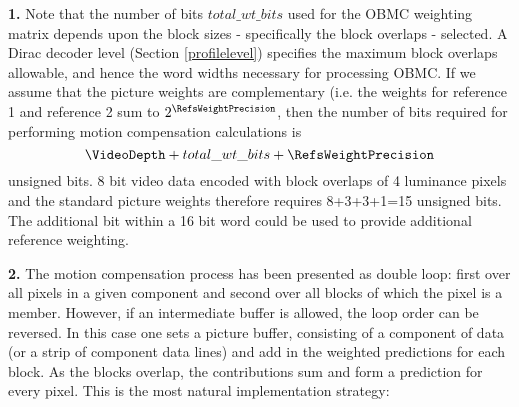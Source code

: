 \begin{informative}

{\bf 1.} Note that the number of bits $total\_wt\_bits$ used for 
the OBMC weighting matrix depends upon the block sizes - specifically
the block overlaps - selected. A Dirac decoder level (Section \ref{profilelevel}) 
specifies the maximum block overlaps allowable, and hence 
the word widths necessary for processing OBMC. If we assume that 
the picture weights are complementary (i.e. the weights
for reference 1 and reference 2 sum to $2^\RefsWeightPrecision$, 
then the number of bits required for performing motion compensation 
calculations is \[\VideoDepth+total\_wt\_bits+\RefsWeightPrecision\]
unsigned bits. 8 bit video data encoded with block overlaps of 4 
luminance pixels and the standard picture weights therefore
requires 8+3+3+1=15 unsigned bits. The additional bit within 
a 16 bit word could be used to provide additional reference 
weighting.


{\bf 2.} The motion compensation process has been presented as double 
loop: first over all pixels in a given component and second over all 
blocks of which the pixel is a member. However, if an intermediate
buffer is allowed, the loop order can be reversed. In this case 
one sets a picture buffer, consisting of 
a component of data (or a strip of component data lines) and 
add in the weighted predictions for each block. As the
blocks overlap, the contributions sum and form a prediction 
for every pixel. This is the most natural implementation
strategy:

\begin{pseudo*}
            \bsELSE
            \bsEND
        \bsEND
    \bsEND
\bsEND
{}
    \bsEND
\bsEND
\end{pseudo*}


\end{informative}
